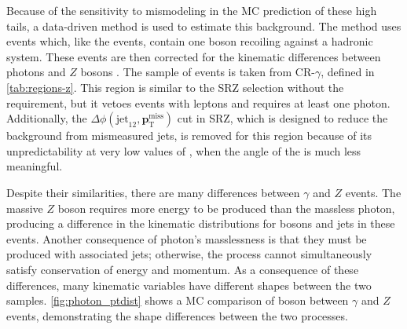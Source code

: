 Because of the sensitivity to mismodeling in the \ac{MC} prediction of these high \met tails, a data-driven method is used to estimate this background. The method uses \gjets events which, like the \dyjets events, contain one boson recoiling against a hadronic system. These \gjets events are then corrected for the kinematic differences between photons and $Z$ bosons \cite{ATLAS:2012ema, Chatrchyan:2012qka}. The sample of \gjets events is taken from CR-$\gamma$, defined in \autoref{tab:regions-z}. This region is similar to the SRZ selection without the \met  requirement, but it vetoes events with leptons and requires at least one photon. Additionally, the $\Delta\phi(\text{jet}_{12},{\boldsymbol p}_{\mathrm{T}}^\mathrm{miss})$ cut in SRZ, which is designed to reduce the background from mismeasured jets, is removed for this region because of its unpredictability at very low values of \met, when the angle of the \met is much less meaningful. 

Despite their similarities, there are many differences between $\gamma$ and $Z$ events. The massive $Z$ boson requires more energy to be produced than the massless photon, producing a difference in the kinematic distributions for bosons and jets in these events. Another consequence of photon's masslessness is that they must be produced with associated jets; otherwise, the process cannot simultaneously satisfy conservation of energy and momentum. As a consequence of these differences, many kinematic variables have different shapes between the two samples. \autoref{fig:photon_ptdist} shows a \ac{MC} comparison of boson \pt between $\gamma$ and $Z$ events, demonstrating the shape differences between the two processes. 

